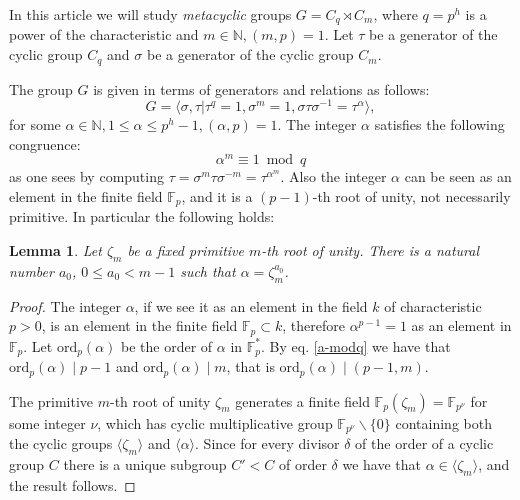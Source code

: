 \documentclass[11pt,letterpaper]{amsart}
\newtheorem{lemma}[theorem]{Lemma}
\theoremstyle{definition}
\renewcommand{\mod}{\bmod}
\begin{document}
In this article we will study  {\em metacyclic} groups $G=C_q \rtimes C_m$, where $q=p^h$ is a power of the characteristic and $m\in \mathbb{N}, (m,p)=1$. Let $\tau$ be a generator of the cyclic group $C_q$ and $\sigma$ be a generator of the cyclic group $C_m$.  

The group $G$ is given in terms of generators and relations as follows:
\begin{equation}
\label{eq:G-def}
G=\langle \sigma,\tau | \tau^q=1, \sigma^m=1, \sigma \tau \sigma^{-1}= \tau^{\alpha}  \rangle,
\end{equation}
for some $\alpha\in \mathbb{N},
 1\leq \alpha \leq p^h-1, (\alpha, p)=1$.
The integer $\alpha$ satisfies the following congruence:
\begin{equation}
  \label{a-modq}
  \alpha^m \equiv 1 \mod q
\end{equation}
as one sees by computing $\tau=\sigma^m \tau\sigma^{-m}=\tau^{\alpha^m}$. 
Also the integer $\alpha$ can be seen as an element in the finite field $\mathbb{F}_p$, and it is a
 $(p-1)$-th root of unity, not necessarily primitive. In particular the following holds:
\begin{lemma}\label{loga} Let $\zeta_m$ be a fixed primitive $m$-th root of unity. 
There is a natural number  $a_0$, $0\leq a_0 < m-1$ such that $\alpha=\zeta_m^{a_0}$.  
\end{lemma}
\begin{proof}
The integer $\alpha$, if we see it as an element in the field $k$ of characteristic $p>0$, is an element in the finite field $\mathbb{F}_p\subset k$, therefore $\alpha^{p-1}=1$ as an element in $\mathbb{F}_p$.
Let $\mathrm{ord}_p(\alpha)$ be the order of $\alpha$ in $\mathbb{F}_p^*$. By eq. \ref{a-modq} we have that $\mathrm{ord}_p(\alpha) \mid p-1$ and $\mathrm{ord}_p(\alpha) \mid m$, that is $\mathrm{ord}_p(\alpha) \mid (p-1,m)$. 

The primitive $m$-th root of unity $\zeta_m$ generates a finite field $\mathbb{F}_p(\zeta_m)=\mathbb{F}_{p^\nu}$
for some integer $\nu$, which has cyclic multiplicative  group $\mathbb{F}_{p^\nu}\backslash \{0\}$ containing both the cyclic groups $\langle \zeta_m \rangle$ and $\langle \alpha \rangle$. Since  for every divisor $\delta$ of the order of a cyclic group $C$ there is a unique subgroup $C' < C$ of order $\delta$ we have that $\alpha \in \langle \zeta_m \rangle$, and the result follows. 
\end{proof}
\end{document}
